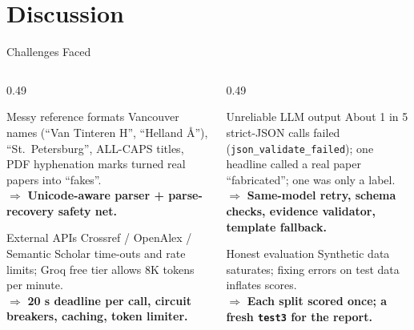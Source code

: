 \documentclass[aspectratio=169,10pt]{beamer}
\newcommand{\hl}[1]{\textcolor{accentblue}{\textbf{#1}}}
\begin{document}
\section{Discussion}

\begin{frame}{Challenges Faced}
  \begin{columns}[T]
    \begin{column}{0.49\textwidth}
      \begin{block}{Messy reference formats}
        \scriptsize Vancouver names (``Van Tinteren H'', ``Helland \AA''), ``St.\ Petersburg'',
        ALL-CAPS titles, PDF hyphenation marks turned real papers into ``fakes''.\\
        $\Rightarrow$ \hl{Unicode-aware parser + parse-recovery safety net.}
      \end{block}
      \begin{block}{External APIs}
        \scriptsize Crossref / OpenAlex / Semantic Scholar time-outs and rate limits; Groq free tier
        allows 8K tokens per minute.\\
        $\Rightarrow$ \hl{20 s deadline per call, circuit breakers, caching, token limiter.}
      \end{block}
    \end{column}
    \begin{column}{0.49\textwidth}
      \begin{block}{Unreliable LLM output}
        \scriptsize About 1 in 5 strict-JSON calls failed (\texttt{json\_validate\_failed}); one
        headline called a real paper ``fabricated''; one was only a label.\\
        $\Rightarrow$ \hl{Same-model retry, schema checks, evidence validator, template fallback.}
      \end{block}
      \begin{block}{Honest evaluation}
        \scriptsize Synthetic data saturates; fixing errors on test data inflates scores.\\
        $\Rightarrow$ \hl{Each split scored once; a fresh \texttt{test3} for the report.}
      \end{block}
    \end{column}
  \end{columns}
\end{frame}
\end{document}
